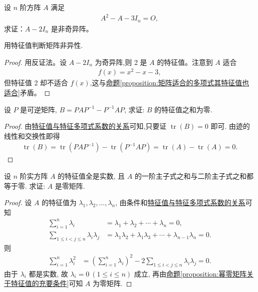 \documentclass[../../main.tex]{subfiles}
\begin{document}
\begin{example}
设 \(n\) 阶方阵 \(A\) 满足 
\begin{align*}
A^2 - A - 3I_n = O,
\end{align*}
求证：\(A - 2I_n\) 是非奇异阵。
\end{example}
\begin{note}
用特征值判断矩阵非异性.
\end{note}
\begin{proof}
用反证法。设 \(A - 2I_n\) 为奇异阵,则 2 是 \(A\) 的特征值。注意到 \(A\) 适合 
\begin{align*}
f(x) = x^2 - x - 3,
\end{align*}
但特征值 2 却不适合 \(f(x)\),这与\hyperref[proposition:矩阵适合的多项式其特征值也适合]{命题\ref{proposition:矩阵适合的多项式其特征值也适合}}矛盾。
\end{proof}

\begin{example}
设 $P$ 是可逆矩阵, $B = PAP^{-1} - P^{-1}AP$, 求证: $B$ 的特征值之和为零.
\end{example}
\begin{proof}
由\hyperref[proposition:特征值与特征多项式系数的关系]{特征值与特征多项式系数的关系}可知,只要证 $\operatorname{tr}(B) = 0$ 即可. 由迹的线性和交换性即得
\begin{align*}
\operatorname{tr}(B) = \operatorname{tr}(PAP^{-1}) - \operatorname{tr}(P^{-1}AP) 
= \operatorname{tr}(A) - \operatorname{tr}(A) = 0.
\end{align*}
\end{proof}

\begin{example}
设 $n$ 阶实方阵 $A$ 的特征值全是实数, 且 $A$ 的一阶主子式之和与二阶主子式之和都等于零. 求证: $A$ 是零矩阵.
\end{example}
\begin{proof}
设 $A$ 的特征值为 $\lambda_1, \lambda_2, \dots, \lambda_n$, 由条件和\hyperref[proposition:特征值与特征多项式系数的关系]{特征值与特征多项式系数的关系}可知
\begin{align*}
\sum_{i=1}^n \lambda_i &= \lambda_1 + \lambda_2 + \cdots + \lambda_n = 0, \\
\sum_{1 \leq i < j \leq n} \lambda_i \lambda_j &= \lambda_1 \lambda_2 + \lambda_1 \lambda_3 + \cdots + \lambda_{n-1} \lambda_n = 0.
\end{align*}
则
\begin{align*}
\sum_{i=1}^n \lambda_i^2 &= \left( \sum_{i=1}^n \lambda_i \right)^2 - 2 \sum_{1 \leq i < j \leq n} \lambda_i \lambda_j = 0.
\end{align*}
由于 $\lambda_i$ 都是实数, 故 $\lambda_i = 0 \ (1 \leq i \leq n)$ 成立, 再由\hyperref[proposition:幂零矩阵关于特征值的充要条件]{命题\ref{proposition:幂零矩阵关于特征值的充要条件}}可知 $A$ 为零矩阵.
\end{proof}
\end{document}
